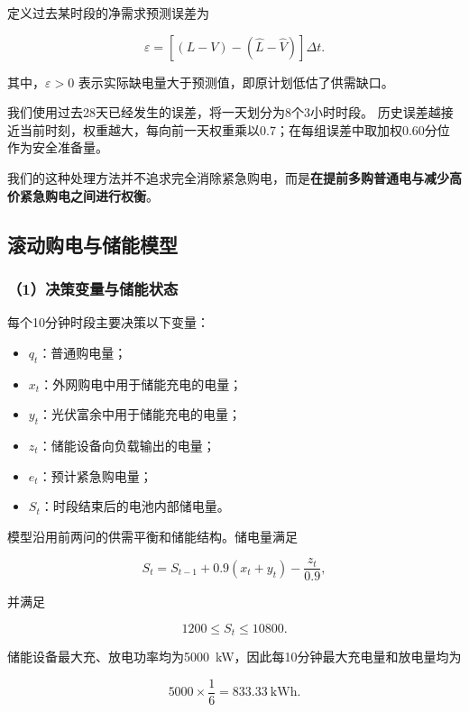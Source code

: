 定义过去某时段的净需求预测误差为

\begin{equation}
\varepsilon
=
\left[
(L-V)-(\widehat L-\widehat V)
\right]\Delta t.
\end{equation}

其中，$\varepsilon>0$ 表示实际缺电量大于预测值，即原计划低估了供需缺口。

我们使用过去28天已经发生的误差，将一天划分为8个3小时时段。
历史误差越接近当前时刻，权重越大，每向前一天权重乘以0.7；在每组误差中取加权0.60分位作为安全准备量。

我们的这种处理方法并不追求完全消除紧急购电，而是\textbf{在提前多购普通电与减少高价紧急购电之间进行权衡}。


\subsection{滚动购电与储能模型}

\subsubsection*{（1）决策变量与储能状态}

每个10分钟时段主要决策以下变量：

\begin{itemize}
    \item $q_t$：普通购电量；
    \item $x_t$：外网购电中用于储能充电的电量；
    \item $y_t$：光伏富余中用于储能充电的电量；
    \item $z_t$：储能设备向负载输出的电量；
    \item $e_t$：预计紧急购电量；
    \item $S_t$：时段结束后的电池内部储电量。
\end{itemize}

模型沿用前两问的供需平衡和储能结构。储电量满足

\begin{equation}
S_t
=
S_{t-1}
+
0.9(x_t+y_t)
-
\frac{z_t}{0.9},
\end{equation}

并满足

\begin{equation}
1200\leq S_t\leq10800.
\end{equation}

储能设备最大充、放电功率均为5000~kW，因此每10分钟最大充电量和放电量均为

\[
5000\times\frac{1}{6}
=
833.33\ \mathrm{kWh}.
\]

